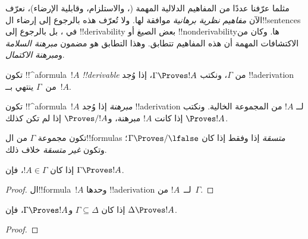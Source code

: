 \documentclass[../../../include/open-logic-section]{subfiles}
\begin{document}
      {}
      {}


\begin{explain}
مثلما عرّفنا عددًا من المفاهيم الدلالية المهمة
(، والاستلزام، وقابلية الإرضاء)، نعرّف
الآن \emph{مفاهيم نظرية برهانية} موافقة لها. ولا تُعرّف هذه بالرجوع إلى
إرضاء ال!!{sentence}s في
، بل بالرجوع إلى
!!{derivability} بعض الصيغ أو !!{nonderivability}ها. وكان من الاكتشافات
المهمة أن هذه المفاهيم تتطابق. وهذا التطابق هو مضمون \emph{مبرهنة السلامة}
و\emph{مبرهنة الاكتمال}.
\end{explain}

\begin{defn}[!!^{derivability}]
تكون !!^a{formula}~$!A$ \emph{!!{derivable}} من $\Gamma$، ونكتب
$\Gamma \Proves !A$، إذا وُجد !!a{derivation} من~$\Gamma$ ينتهي
بــ~$!A$.
\end{defn}

\begin{defn}[المبرهنات]
تكون !!^a{formula}~$!A$ \emph{مبرهنة} إذا وُجد !!a{derivation} لــ
$!A$ من المجموعة الخالية. ونكتب $\Proves !A$ إذا كانت $!A$ مبرهنة،
و$\Proves/ !A$ إذا لم تكن كذلك.
\end{defn}

\begin{defn}[الاتساق]
تكون مجموعة $\Gamma$ من ال!!{formula}s \emph{متسقة} إذا وفقط إذا كان
$\Gamma\Proves/ \lfalse$؛ وتكون \emph{غير متسقة} خلاف ذلك.
\end{defn}

\begin{prop}[الانعكاسية]
إذا كان $!A \in \Gamma$، فإن $\Gamma \Proves !A$.
\end{prop}

\begin{proof}
  ال!!{formula}~$!A$ وحدها !!a{derivation} لــ~$!A$ من~$\Gamma$.
\end{proof}

\begin{prop}[الرتابة]
إذا كان $\Gamma \subseteq \Delta$ و$\Gamma \Proves !A$، فإن $\Delta
\Proves !A$.
\end{prop}

\begin{proof}
\end{proof}
\end{document}
